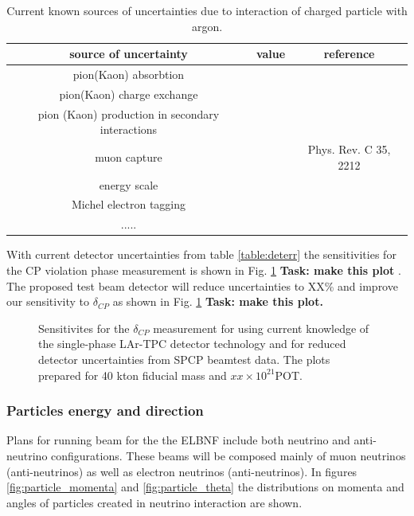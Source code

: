 \begin{table}[h]
\centering
\caption{Current known sources of  uncertainties due to interaction of charged particle with argon.}
\label{table:physicserr}
\begin{tabular}{|c|c|c|}
\hline
\textbf{source of uncertainty } & \textbf{value} & \textbf{reference}  \\ \hline
 pion(Kaon) absorbtion       &           &                   \\ \hline
 pion(Kaon) charge exchange       &           &            \\ \hline
pion (Kaon) production in secondary interactions  &   &  \\ \hline
 muon capture       &           &  Phys. Rev. C 35, 2212      \\ \hline
energy scale  &   &   \\ \hline
Michel electron tagging  &  &  \\ \hline

 .....   &   &   \\ \hline
\end{tabular}
\end{table}



With current detector uncertainties from table \ref{table:deterr} the sensitivities for the CP violation phase measurement is shown in Fig. \ref{fig:cpsensitivity}  {\bf Task: make this plot} . The  proposed test beam detector will reduce uncertainties to XX\%  and improve our sensitivity to $\delta_{CP}$ as shown in Fig. \ref{fig:cpsensitivity} {\bf Task: make this plot.}



\begin{figure}[h!]
  \centering
\label{fig:cpsensitivity}
  \caption{Sensitivites for the $\delta_{CP}$ measurement  for using current knowledge of the single-phase LAr-TPC detector technology and for reduced detector uncertainties from SPCP beamtest data.  The plots prepared for 40 kton fiducial mass and $xx\times 10^{21}$POT.}
\end{figure}

\newpage

\subsubsection{Particles energy and direction}
\label{detbeam_particles}
Plans for running beam for the the ELBNF include both neutrino and anti-neutrino configurations. These beams will be composed  mainly of muon neutrinos (anti-neutrinos) as well as electron neutrinos (anti-neutrinos). In figures \ref{fig:particle_momenta} and \ref{fig:particle_theta} the distributions on momenta and angles of particles created in neutrino interaction are shown. 

